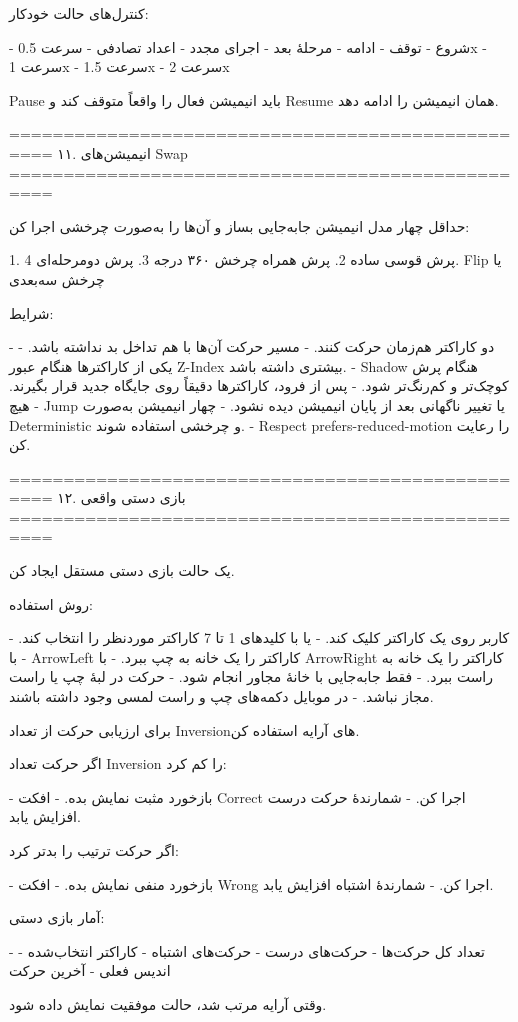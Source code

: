 کنترل‌های حالت خودکار:

- شروع
- توقف
- ادامه
- مرحلهٔ بعد
- اجرای مجدد
- اعداد تصادفی
- سرعت 0.5x
- سرعت 1x
- سرعت 1.5x
- سرعت 2x

Pause باید انیمیشن فعال را واقعاً متوقف کند و Resume همان انیمیشن را ادامه دهد.

==================================================
۱۱. انیمیشن‌های Swap
==================================================

حداقل چهار مدل انیمیشن جابه‌جایی بساز و آن‌ها را به‌صورت چرخشی اجرا کن:

1. پرش قوسی ساده
2. پرش همراه چرخش ۳۶۰ درجه
3. پرش دو‌مرحله‌ای
4. Flip یا چرخش سه‌بعدی

شرایط:

- دو کاراکتر هم‌زمان حرکت کنند.
- مسیر حرکت آن‌ها با هم تداخل بد نداشته باشد.
- یکی از کاراکترها هنگام عبور Z-Index بیشتری داشته باشد.
- Shadow هنگام پرش کوچک‌تر و کم‌رنگ‌تر شود.
- پس از فرود، کاراکترها دقیقاً روی جایگاه جدید قرار بگیرند.
- هیچ Jump یا تغییر ناگهانی بعد از پایان انیمیشن دیده نشود.
- چهار انیمیشن به‌صورت Deterministic و چرخشی استفاده شوند.
- Respect prefers-reduced-motion را رعایت کن.

==================================================
۱۲. بازی دستی واقعی
==================================================

یک حالت بازی دستی مستقل ایجاد کن.

روش استفاده:

- کاربر روی یک کاراکتر کلیک کند.
- یا با کلیدهای 1 تا 7 کاراکتر موردنظر را انتخاب کند.
- با ArrowLeft کاراکتر را یک خانه به چپ ببرد.
- با ArrowRight کاراکتر را یک خانه به راست ببرد.
- فقط جابه‌جایی با خانهٔ مجاور انجام شود.
- حرکت در لبهٔ چپ یا راست مجاز نباشد.
- در موبایل دکمه‌های چپ و راست لمسی وجود داشته باشند.

برای ارزیابی حرکت از تعداد Inversionهای آرایه استفاده کن.

اگر حرکت تعداد Inversion را کم کرد:

- بازخورد مثبت نمایش بده.
- افکت Correct اجرا کن.
- شمارندهٔ حرکت درست افزایش یابد.

اگر حرکت ترتیب را بدتر کرد:

- بازخورد منفی نمایش بده.
- افکت Wrong اجرا کن.
- شمارندهٔ اشتباه افزایش یابد.

آمار بازی دستی:

- تعداد کل حرکت‌ها
- حرکت‌های درست
- حرکت‌های اشتباه
- کاراکتر انتخاب‌شده
- اندیس فعلی
- آخرین حرکت

وقتی آرایه مرتب شد، حالت موفقیت نمایش داده شود.

